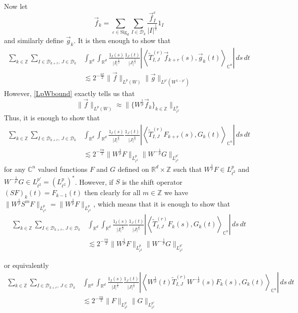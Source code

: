 \documentclass[12pt,reqno ]{amsart}
\numberwithin{equation}{section}
\theoremstyle{definition}
\newcommand{\C}{\ensuremath{\mathbb{C}^n}}
\newcommand{\Z}{\ensuremath{\mathbb{Z}}}
\newcommand{\Rd}{\ensuremath{\mathbb{R}^d}}
\newcommand{\D}{\ensuremath{\mathscr{D}}}
\newcommand{\V}[1]{\ensuremath{\vec{#1}}}
\newcommand{\ip}[2]{\ensuremath{\left\langle#1,#2\right\rangle}}
\newcommand{\W}[1]{\ensuremath{\widetilde{#1}}}
\renewcommand{\S}{\ensuremath{\text{Sig}_d}}
\begin{document}
Now let \begin{equation*} \V{f}_k = \sum_{\varepsilon \in \S} \sum_{I \in \D_k} \frac{\V{f}_I ^\varepsilon }{|I|^\frac12} 1_I   \end{equation*}  and similarly define $\V{g}_k$. It is then enough to show that \begin{align*}   \sum_{k \in \Z} \sum_{I \in \D_{k + r}, \,   J \in \D_{k } } & \int_{\Rd} \int_{\Rd}  \frac{1_I(s)}{|I|^{\frac12}} \frac{1_J(t)}{|J|^{\frac12}} \left|\ip{\W{T}_{I, J} ^{(r)}  \V{f}_{k + r}(s)}{\V{g}_{k} (t)}_{\C} \right| \, ds \, dt \\ & \lesssim  2^{-\frac{\alpha r}{2}} \|\V{f}\|_{L^p(W)} \|\V{g}\|_{L^{p'}(W^{1 - p'})} \end{align*}    \noindent   However, \eqref{LpWbound} exactly tells us that \begin{equation*} \|\vec{f} \|_{L^p(W)} \approx \|\{W^\frac{1}{p} \V{f}_k \}_{k \in \Z} \|_{L^p _{\ell^2}}  \end{equation*} Thus, it is enough to show that \begin{align*}   \sum_{k \in \Z} \sum_{I \in \D_{k + r}, \,   J \in \D_{k } } & \int_{\Rd} \int_{\Rd}  \frac{1_I(s)}{|I|^{\frac12}} \frac{1_J(t)}{|J|^{\frac12}} \left|\ip{\W{T}_{I, J} ^{(r)}  F_{k + r}(s)}{G_{k} (t)}_{\C} \right| \, ds \, dt \\ & \lesssim  2^{-\frac{r\alpha}{2}} \|W^{\frac{1}{p}} F \|_{L^p _{\ell^2}} \|W^{-\frac{1}{p}} G\|_{L^{p'}  _{\ell^2} } \end{align*}
for any $\C$ valued functions $F$ and $G$ defined on $\Rd \times \Z$ such that $W^\frac{1}{p} F  \in L^p _{\ell^2}$ and $W^{-\frac{1}{p'}} G  \in L^{p'}  _{\ell^2} = (L^p _{\ell^2})^*$.  However, if $S$ is the shift operator $(SF)_k (t) = F_{k - 1} (t)$ then clearly for all $m \in \Z$ we have $\|W^\frac{1}{p} S^m F\|_{L^p _{\ell^2}} = \|W^\frac{1}{p}  F\|_{L^p _{\ell^2}}$, which means that it is enough to show that \begin{align*}   \sum_{k \in \Z} \sum_{I \in \D_{k + r}, \,   J \in \D_{k } } & \int_{\Rd} \int_{\Rd}  \frac{1_I(s)}{|I|^{\frac12}} \frac{1_J(t)}{|J|^{\frac12}} \left|\ip{\W{T}_{I, J} ^{(r)}  F_{k }(s)}{G_{k} (t)}_{\C} \right| \, ds \, dt \nonumber \\ & \lesssim  2^{-\frac{r\alpha}{2}} \|W^{\frac{1}{p}} F \|_{L^p _{\ell^2}} \|W^{-\frac{1}{p}} G\|_{L^{p'}  _{\ell^2} }  \end{align*}

or equivalently \begin{align}   \sum_{k \in \Z} \sum_{I \in \D_{k + r}, \,   J \in \D_{k } } & \int_{\Rd} \int_{\Rd}  \frac{1_I(s)}{|I|^{\frac12}} \frac{1_J(t)}{|J|^{\frac12}} \left|\ip{ W^\frac{1}{p} (t) \W{T}_{I, J} ^{(r)}  W^{-\frac{1}{p}} (s) F_{k }(s)}{G_{k} (t)}_{\C} \right| \, ds \, dt \nonumber \\ & \lesssim  2^{-\frac{r\alpha}{2}} \| F \|_{L^p _{\ell^2}} \| G\|_{L^{p'}  _{\ell^2} }   \label{FinalKerEst1}  \end{align}
\end{document}
